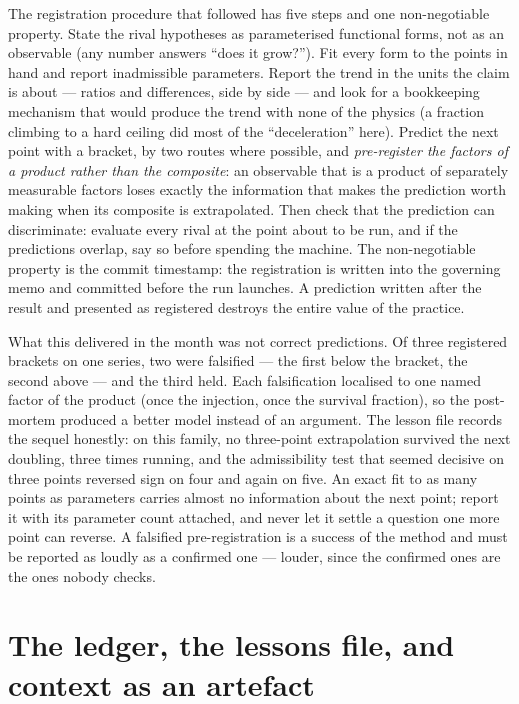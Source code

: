 \documentclass[11pt]{article}
\begin{document}
The registration procedure that followed has five steps and one non-negotiable property. State
the rival hypotheses as parameterised functional forms, not as an observable (any number
answers ``does it grow?''). Fit every form to the points in hand and report inadmissible
parameters. Report the trend in the units the claim is about --- ratios and differences, side by
side --- and look for a bookkeeping mechanism that would produce the trend with none of the
physics (a fraction climbing to a hard ceiling did most of the ``deceleration'' here). Predict
the next point with a bracket, by two routes where possible, and \emph{pre-register the factors
of a product rather than the composite}: an observable that is a product of separately
measurable factors loses exactly the information that makes the prediction worth making when
its composite is extrapolated. Then check that the prediction can discriminate: evaluate every
rival at the point about to be run, and if the predictions overlap, say so before spending the
machine. The non-negotiable property is the commit timestamp: the registration is written into
the governing memo and committed before the run launches. A prediction written after the result
and presented as registered destroys the entire value of the practice.

What this delivered in the month was not correct predictions. Of three registered brackets on
one series, two were falsified --- the first below the bracket, the second above --- and the
third held. Each falsification localised to one named factor of the product (once the
injection, once the survival fraction), so the post-mortem produced a better model instead of
an argument. The lesson file records the sequel honestly: on this family, no three-point
extrapolation survived the next doubling, three times running, and the admissibility test that
seemed decisive on three points reversed sign on four and again on five. An exact fit to as many
points as parameters carries almost no information about the next point; report it with its
parameter count attached, and never let it settle a question one more point can reverse. A
falsified pre-registration is a success of the method and must be reported as loudly as a
confirmed one --- louder, since the confirmed ones are the ones nobody checks.

\section{The ledger, the lessons file, and context as an artefact}
\label{sec:ledger}
\end{document}
